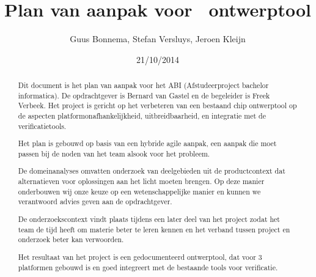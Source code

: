 \documentclass[a4paper,11pt,final]{article}
\author{Guus Bonnema, Stefan Versluys, Jeroen Kleijn}
\date{21/10/2014}
\title{Plan van aanpak voor \xmas\ ontwerptool}
\begin{document}

\newcommand{\xmas}{x\textsc{mas}}%
\newcommand{\ok}{$\checkmark$}

\newcommand{\mybox}[1]{\begin{boxedminipage}[t]{\textwidth}#1\end{boxedminipage}}


\newcommand\secformat[1]{%
    {\fontsize{60}{60}\selectfont\thesection}%
    \ifthenelse{\equal{\thesection}{}}{}{\quad\rule[-8pt]{2pt}{40pt}\quad}
    \parbox[b]{.7\textwidth}{\filright\bfseries #1}}%
\titleformat{\section}[block]
    {\filright\normalfont\sffamily}{}{0pt}{\secformat}
[1pc]

\maketitle

\begin{abstract}
 Dit document is het plan van aanpak voor het ABI (Afstudeerproject bachelor
 informatica). De opdrachtgever is Bernard van Gastel en de begeleider is
 Freek Verbeek. Het project is gericht op het verbeteren van een bestaand
 chip ontwerptool op de aspecten platformonafhankelijkheid, uitbreidbaarheid,
 en integratie met de verificatietools.

 Het plan is gebouwd op basis van een hybride agile aanpak, een aanpak die
 moet passen bij de noden van het team alsook voor het probleem.

 De domeinanalyses omvatten onderzoek van deelgebieden uit de productcontext
 dat alternatieven voor oplossingen aan het licht moeten brengen.
 Op deze manier onderbouwen wij onze keuze op een wetenschappelijke manier
 en kunnen we verantwoord advies geven aan de opdrachtgever.

 De onderzoekscontext vindt plaats tijdens een later deel van het project
 zodat het team de tijd heeft om materie beter te leren kennen en het
 verband tussen project en onderzoek beter kan verwoorden.

 Het resultaat van het project is een gedocumenteerd ontwerptool, dat voor
 3 platformen gebouwd is en goed integreert met de bestaande tools voor verificatie.

\end{abstract}
\end{document}
